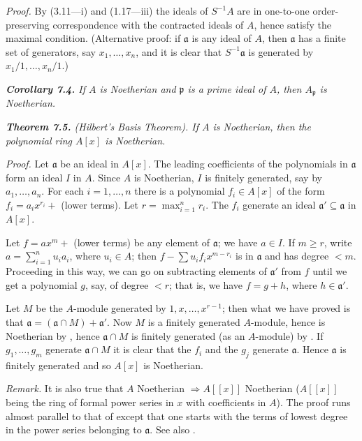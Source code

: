 \noindent\emph{Proof.}  By (3.11---i) and (1.17---iii) the ideals of $S^{-1}A$ are in one-to-one order-preserving correspondence with the contracted ideals of $A$, hence satisfy the maximal condition.  (Alternative proof: if $\mathfrak a$ is any ideal of $A$, then $\mathfrak a$ has a finite set
of generators, say $x_1,\ldots,x_n$, and it is clear that $S^{-1}\mathfrak a$ is generated by $x_1/1,\ldots,
x_n/1$.)\proofbox

\medskip
\noindent\textit{\textbf{Corollary 7.4.} If $A$ is Noetherian and $\mathfrak p$ is a prime ideal of $A$, then $A_\mathfrak p$ is
Noetherian.}\proofbox

\medskip
\noindent\textit{\textbf{Theorem 7.5.} (Hilbert's Basis Theorem). If $A$ is Noetherian, then the
polynomial ring $A[x]$ is Noetherian.}

\noindent\emph{Proof.}  Let $\mathfrak a$ be an ideal in $A[x]$.  The leading coefficients of the polynomials in
$\mathfrak a$ form an ideal $I$ in $A$.  Since $A$ is Noetherian, $I$ is finitely generated, say by
$a_1,\ldots,a_n$.  For each $i=1,\ldots,n$ there is a polynomial $f_i\in A[x]$ of the form
$f_i=a_ix^{r_i}+$ (lower terms).  Let $r=\max_{i=1}^n r_i$.  The $f_i$ generate an ideal
$\mathfrak a'\subseteq\mathfrak a$ in $A[x]$.

Let $f=ax^m+$ (lower terms) be any element of $\mathfrak a$; we have $a\in I$.  If $m\geq r$,
write $a=\sum_{i=1}^n u_i a_i$, where $u_i\in A$; then $f-\sum u_if_ix^{m-r_i}$ is in $\mathfrak a$ and has degree
$<m$.  Proceeding in this way, we can go on subtracting elements of $\mathfrak a'$ from $f$
until we get a polynomial $g$, say, of degree $<r$; that is, we have $f=g+h$,
where $h\in\mathfrak a'$.

Let $M$ be the $A$-module generated by $1,x,\ldots,x^{r-1}$; then what we have
proved is that $\mathfrak a=(\mathfrak a\cap M)+\mathfrak a'$.  Now $M$ is a finitely generated $A$-module,
hence is Noetherian by , hence $\mathfrak a\cap M$ is finitely generated (as an $A$-module)
by .  If $g_1,\ldots,g_m$ generate $\mathfrak a\cap M$ it is clear that the $f_i$ and the $g_j$ generate $\mathfrak a$.
Hence $\mathfrak a$ is finitely generated and so $A[x]$ is Noetherian.\proofbox

\emph{Remark.}  It is also true that $A$ Noetherian $\Rightarrow A[[x]]$ Noetherian ($A[[x]]$ being
the ring of formal power series in $x$ with coefficients in $A$).  The proof runs
almost parallel to that of  except that one starts with the terms of lowest
degree in the power series belonging to $\mathfrak a$.  See also .

